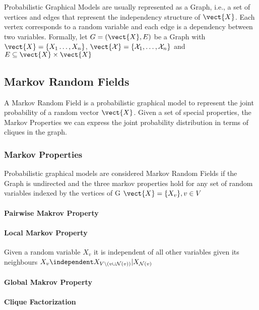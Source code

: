 Probabilistic Graphical Models are usually represented as a Graph, i.e., a set of vertices and edges that represent the independency structure of $\vect{X}$.
Each vertex corresponds to a random variable and each edge is a dependency between two variables.
Formally, let $G = (\vect{X},E)$ be a Graph with $\vect{X} =\{X_1 \ldots, X_n\}$, $\vect{\mathcal{X}} = \{\mathcal{X}_1, \ldots, \mathcal{X}_n\}$ and $E \subseteq \vect{X} \times \vect{X}$

\subsection{Markov Random Fields}

A Markov Random Field is a probabilistic graphical model to represent the joint probability of a random vector $\vect{X}$. 
Given a set of special properties, the Markov Properties we can express the joint probability distribution in terms of cliques in the graph.

\subsubsection*{Markov Properties}
Probabilistic graphical models are considered Markov Random Fields if the Graph is undirected and the three markov properties hold for any set of random variables indexed by the vertices of G $\vect{X} = \{X_v\}, v \in V$

\paragraph*{Pairwise Makrov Property}
\paragraph*{Local Markov Property}
Given a random variable $X_v$ it is independent of all other variables given its neighbours 
$X_v \independent X_{V\setminus (v \cup \mathcal{N}(v))} \lvert X_{\mathcal{N}(v)}$
\paragraph*{Global Makrov Property}

\paragraph*{}
\paragraph*{Clique Factorization}

